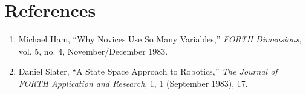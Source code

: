 \section{References}

\begin{enumerate}
\item Michael Ham, ``Why Novices Use So Many Variables,'' \emph{FORTH
   Dimensions}, vol. 5, no. 4, November/December 1983.
\item Daniel Slater, ``A State Space Approach to Robotics,'' \emph{The Journal
   of FORTH Application and Research}, 1, 1 (September 1983), 17.
\end{enumerate}

